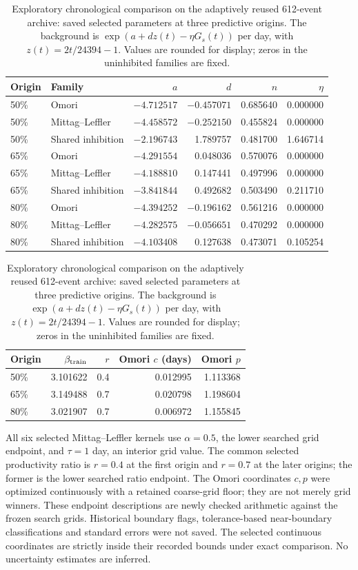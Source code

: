 \begin{table}[htbp]
\centering\small
\setlength{\tabcolsep}{4pt}
\caption{Exploratory chronological comparison on the adaptively reused 612-event archive: saved selected parameters at three predictive origins. The background is \(\exp(a+dz(t)-\eta G_s(t))\) per day, with \(z(t)=2t/24394-1\). Values are rounded for display; zeros in the uninhibited families are fixed.}
\label{tab:saved-predictive-parameters}
\begin{tabular}{llrrrr}
\toprule Origin & Family & \(a\) & \(d\) & \(n\) & \(\eta\) \\ \midrule
50\% & Omori & $-4.712517$ & $-0.457071$ & 0.685640 & 0.000000 \\
50\% & Mittag--Leffler & $-4.458572$ & $-0.252150$ & 0.455824 & 0.000000 \\
50\% & Shared inhibition & $-2.196743$ & 1.789757 & 0.481700 & 1.646714 \\
65\% & Omori & $-4.291554$ & 0.048036 & 0.570076 & 0.000000 \\
65\% & Mittag--Leffler & $-4.188810$ & 0.147441 & 0.497996 & 0.000000 \\
65\% & Shared inhibition & $-3.841844$ & 0.492682 & 0.503490 & 0.211710 \\
80\% & Omori & $-4.394252$ & $-0.196162$ & 0.561216 & 0.000000 \\
80\% & Mittag--Leffler & $-4.282575$ & $-0.056651$ & 0.470292 & 0.000000 \\
80\% & Shared inhibition & $-4.103408$ & 0.127638 & 0.473071 & 0.105254 \\
\bottomrule
\end{tabular}
\par\medskip
\begin{tabular}{lrrrr}
\toprule Origin & \(\beta_{\rm train}\) & \(r\) & Omori \(c\) (days) & Omori \(p\) \\ \midrule
50\% & 3.101622 & 0.4 & 0.012995 & 1.113368 \\
65\% & 3.149488 & 0.7 & 0.020798 & 1.198604 \\
80\% & 3.021907 & 0.7 & 0.006972 & 1.155845 \\
\bottomrule
\end{tabular}
\end{table}

All six selected Mittag--Leffler kernels use \(\alpha=0.5\), the lower searched grid endpoint, and \(\tau=1\) day, an interior grid value. The common selected productivity ratio is \(r=0.4\) at the first origin and \(r=0.7\) at the later origins; the former is the lower searched ratio endpoint. The Omori coordinates \(c,p\) were optimized continuously with a retained coarse-grid floor; they are not merely grid winners. These endpoint descriptions are newly checked arithmetic against the frozen search grids. Historical boundary flags, tolerance-based near-boundary classifications and standard errors were not saved. The selected continuous coordinates are strictly inside their recorded bounds under exact comparison. No uncertainty estimates are inferred.

